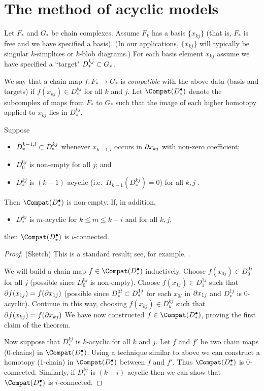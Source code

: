 
\section{The method of acyclic models}  \label{sec:moam}

Let $F_*$ and $G_*$ be chain complexes.
Assume $F_k$ has a basis $\{x_{kj}\}$
(that is, $F_*$ is free and we have specified a basis).
(In our applications, $\{x_{kj}\}$ will typically be singular $k$-simplices or 
$k$-blob diagrams.)
For each basis element $x_{kj}$ assume we have specified a ``target" $D^{kj}_*\subset G_*$.

We say that a chain map $f:F_*\to G_*$ is {\it compatible} with the above data (basis and targets)
if $f(x_{kj})\in D^{kj}_*$ for all $k$ and $j$.
Let $\Compat(D^\bullet_*)$ denote the subcomplex of maps from $F_*$ to $G_*$
such that the image of each higher homotopy applied to $x_{kj}$ lies in $D^{kj}_*$.

\begin{thm}  \label{moam-thm}
Suppose 
\begin{itemize}
\item $D^{k-1,l}_* \subset D^{kj}_*$ whenever $x_{k-1,l}$ occurs in $\partial x_{kj}$
with non-zero coefficient;
\item $D^{0j}_0$ is non-empty for all $j$; and
\item $D^{kj}_*$ is $(k{-}1)$-acyclic (i.e.\ $H_{k-1}(D^{kj}_*) = 0$) for all $k,j$ .
\end{itemize}
Then $\Compat(D^\bullet_*)$ is non-empty.
If, in addition,
\begin{itemize}
\item $D^{kj}_*$ is $m$-acyclic for $k\le m \le k+i$ and for all $k,j$,
\end{itemize}
then $\Compat(D^\bullet_*)$ is $i$-connected.
\end{thm}

\begin{proof}
(Sketch)
This is a standard result; see, for example, .

We will build a chain map $f\in \Compat(D^\bullet_*)$ inductively.
Choose $f(x_{0j})\in D^{0j}_0$ for all $j$
(possible since $D^{0j}_0$ is non-empty).
Choose $f(x_{1j})\in D^{1j}_1$ such that $\partial f(x_{1j}) = f(\partial x_{1j})$
(possible since $D^{0l}_* \subset D^{1j}_*$ for each $x_{0l}$ in $\partial x_{1j}$
and $D^{1j}_*$ is 0-acyclic).
Continue in this way, choosing $f(x_{kj})\in D^{kj}_k$ such that $\partial f(x_{kj}) = f(\partial x_{kj})$
We have now constructed $f\in \Compat(D^\bullet_*)$, proving the first claim of the theorem.

Now suppose that $D^{kj}_*$ is $k$-acyclic for all $k$ and $j$.
Let $f$ and $f'$ be two chain maps (0-chains) in $\Compat(D^\bullet_*)$.
Using a technique similar to above we can construct a homotopy (1-chain) in $\Compat(D^\bullet_*)$
between $f$ and $f'$.
Thus $\Compat(D^\bullet_*)$ is 0-connected.
Similarly, if $D^{kj}_*$ is $(k{+}i)$-acyclic then we can show that $\Compat(D^\bullet_*)$ is $i$-connected.
\end{proof}

